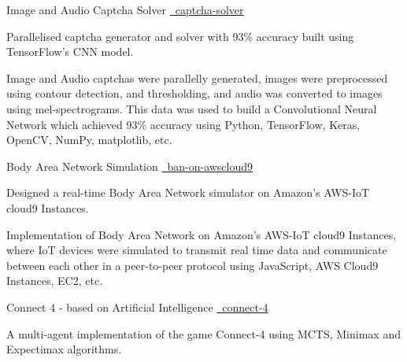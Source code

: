 \begin{cventries}
   \cvproject
    {Image and Audio Captcha Solver}
    {
    {}
    {\href{https://github.com/mukeshmk/image-audio-captcha}
    {\faGithubSquare\ captcha-solver}}
    }
    {}
    {
      \begin{cvitems}
      \vspace{-0.5ex}
        {
        \item {Parallelised captcha generator and solver with 93\% accuracy built using TensorFlow’s CNN model.}
        }
        {
        Image and Audio captchas were parallelly generated, images were preprocessed using contour detection, and thresholding, and audio was converted to images using mel-spectrograms. This data was used to build a Convolutional Neural Network which achieved 93\% accuracy using Python, TensorFlow, Keras, OpenCV, NumPy, matplotlib, etc.
        }
      \end{cvitems}
    }
  \cvproject
    {Body Area Network Simulation}
    {
    {}
    {\href{https://github.com/mukeshmk/ban-on-awscloud9}{\faGithubSquare\ ban-on-awscloud9}}
    }
    {}
    {
       \begin{cvitems}
       \vspace{-0.5ex}
        {
        \item{Designed a real-time Body Area Network simulator on Amazon's AWS-IoT cloud9 Instances.}
        }
        {
        Implementation of Body Area Network on Amazon's AWS-IoT cloud9 Instances, where IoT devices were simulated to transmit real time data and communicate between each other in a peer-to-peer protocol using JavaScript, AWS Cloud9 Instances, EC2, etc.
        }
      \end{cvitems}
    }
  \cvproject
    {Connect 4 - based on Artificial Intelligence}
    {
    {}
    {\href{https://github.com/mukeshmk/connect-4}{\faGithubSquare\ connect-4}}
    }
    {}
    {
      \begin{cvitems}
      \vspace{-0.5ex}
      {
      \item {A multi-agent implementation of the game Connect-4 using MCTS, Minimax and Expectimax algorithms.} 
}
\end{cvitems}}
\end{cventries}
